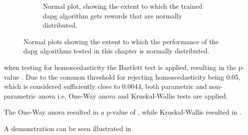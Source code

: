 \begin{figure}[!h]
\begin{subfigure}[b]{0.48\textwidth}
		\caption{Normal plot, showing the extent to which the trained \gls{dapg} algorithm gets rewards that are normally distributed.}
		\label{fig:sampled-data-points-vs-normally-distributed-points-trained}
	\end{subfigure}
	\caption{Normal plots showing the extent to which the performance of the \gls{dapg} algorithms tested in this chapter is normally distributed.}
	\label{fig:sampled-data-points-vs-normally-distributed-points-trained-authors}
\end{figure}

when testing for homoscedasticity the Bartlett test is applied, resulting in the p-value . Due to the common threshold for rejecting homoscedasticity being \num{0.05}, which is considered sufficiently close to \num{0.0044}, both parametric and non-parametric \gls{anova} i.e. One-Way \gls{anova} and Kruskal-Wallis tests are applied. \medskip

The One-Way \gls{anova} resulted in a p-value of , while Kruskal-Wallis resulted in .

A demonstration can be seen illustrated in~

